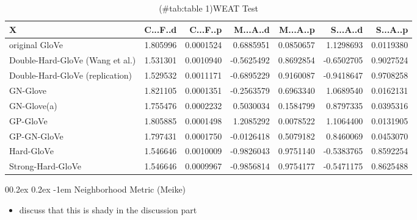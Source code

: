 \documentclass[
  english,
  man,floatsintext]{apa6}
\makeatletter
\providecommand{\tightlist}{%
  \setlength{\itemsep}{0pt}\setlength{\parskip}{0pt}}
\let\oldparagraph\paragraph
\renewcommand{\paragraph}[1]{\oldparagraph{#1}\mbox{}}
\renewcommand{\paragraph}{\@startsection{paragraph}{4}{\parindent}%
  {0\baselineskip \@plus 0.2ex \@minus 0.2ex}%
  {-1em}%
  {\normalfont\normalsize\bfseries\itshape\typesectitle}}
\makeatother
\begin{document}
\begin{table}

\caption{(\#tab:table 1)WEAT Test}
\centering
\begin{tabular}[t]{l|r|r|r|r|r|r}
\hline
X & C...F..d & C...F..p & M...A..d & M...A..p & S...A..d & S...A..p\\
\hline
original GloVe & 1.805996 & 0.0001524 & 0.6885951 & 0.0850657 & 1.1298693 & 0.0119380\\
\hline
Double-Hard-GloVe (Wang et al.) & 1.531301 & 0.0010940 & -0.5625492 & 0.8692854 & -0.6502705 & 0.9027524\\
\hline
Double-Hard-GloVe (replication) & 1.529532 & 0.0011171 & -0.6895229 & 0.9160087 & -0.9418647 & 0.9708258\\
\hline
GN-Glove & 1.821105 & 0.0001351 & -0.2563579 & 0.6963340 & 1.0689540 & 0.0162131\\
\hline
GN-Glove(a) & 1.755476 & 0.0002232 & 0.5030034 & 0.1584799 & 0.8797335 & 0.0395316\\
\hline
GP-GloVe & 1.805885 & 0.0001498 & 1.2085292 & 0.0078522 & 1.1064400 & 0.0131905\\
\hline
GP-GN-GloVe & 1.797431 & 0.0001750 & -0.0126418 & 0.5079182 & 0.8460069 & 0.0453070\\
\hline
Hard-GloVe & 1.546646 & 0.0010009 & -0.9826043 & 0.9751140 & -0.5383765 & 0.8592254\\
\hline
Strong-Hard-GloVe & 1.546646 & 0.0009967 & -0.9856814 & 0.9754177 & -0.5471175 & 0.8625488\\
\hline
\end{tabular}
\end{table}

\hypertarget{neighborhood-metric-meike}{%
\paragraph{Neighborhood Metric (Meike)}\label{neighborhood-metric-meike}}

\begin{itemize}
\tightlist
\item
  discuss that this is shady in the discussion part
\end{itemize}
\end{document}
